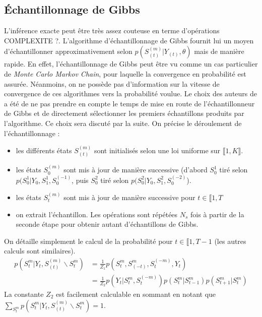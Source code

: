 \documentclass[10pt,a4paper]{article}
\begin{document}
\subsection{Échantillonnage de Gibbs}
L'inférence exacte peut être très assez couteuse en terme d'opérations COMPLEXITE ?. L'algorithme d'échantillonnage de Gibbs fournit lui un moyen d'échantillonner approximativement selon $p(S_{(t)}^{(m)} \vert Y_{(t)}, \theta)$ mais de manière rapide. En effet, l'échantillonnage de Gibbs peut être vu comme un cas particulier de \emph{Monte Carlo Markov Chain}, pour laquelle la convergence en probabilité est assurée. Néanmoins, on ne possède pas d'information sur la vitesse de convergence de ces algorithmes vers la probabilité voulue. Le choix des auteurs de \cite{ghahramani1997factorial} a été de ne pas prendre en compte le temps de mise en route de l'échantillonneur de Gibbs et de directement sélectionner les premiers échantillons produits par l'algorithme. Ce choix sera discuté par la suite. On précise le déroulement de l'échantillonnage :
\begin{itemize}
\item les différents états $S_{(t)}^{(m)}$ sont initialisés selon une loi uniforme sur $\llbracket 1,K \rrbracket$.
\item les états $S_0^{(m)}$ sont mis à jour de manière successive (d'abord $S_0^1$ tiré selon $p(S_0^1 \vert Y_{0}, S_1^1, S_0^{(-1)}$, puis $S_0^2$ tiré selon $p(S_0^2 \vert Y_{0}, S_1^2, S_0^{(-2)}$).
\item les états $S_t^{(m)}$ sont mis à jour de manière successive pour $t \in \llbracket 1,T$
\item on extrait l'échantillon. Les opérations sont répétées $N_s$ fois à partir de la seconde étape pour obtenir autant d'échantillons de Gibbs.
\end{itemize}
On détaille simplement le calcul de la probabilité pour $t \in \llbracket 1,T-1$ (les autres calculs sont similaires).
\begin{equation}
\begin{aligned}
p(S_t^m \vert Y_t, S_{(t)}^{(m)} \backslash S_t^m)&=\frac{1}{Z_1}p(S_t^{m}, S_{(-t)}^{m}, S_{t}^{(-m)},Y_t) \\
&=\frac{1}{Z_2}p(Y_t \vert S_t^{m},S_t^{(-m)}) p(S_t^m \vert S_{t-1}^m) p(S_{t+1}^m \vert S_t^m)
\end{aligned}
\end{equation}
La constante $Z_2$ est facilement calculable en sommant en notant que $\underset{S_t^m}{\sum}p(S_t^m \vert Y_t, S_{(t)}^{(m)} \backslash S_t^m)=1$.


\end{document}
